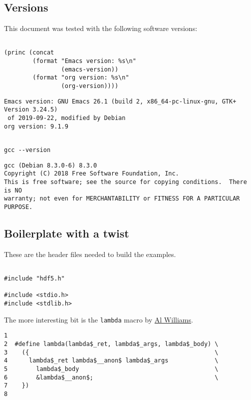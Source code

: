 \documentclass[a4paper, 12pt]{article}
\begin{document}
\subsection{Versions}
\label{sec:org5a092bd}
This document was tested with the following software versions:

\begin{verbatim}

(princ (concat
        (format "Emacs version: %s\n"
                (emacs-version))
        (format "org version: %s\n"
                (org-version))))

\end{verbatim}

\begin{verbatim}
Emacs version: GNU Emacs 26.1 (build 2, x86_64-pc-linux-gnu, GTK+ Version 3.24.5)
 of 2019-09-22, modified by Debian
org version: 9.1.9
\end{verbatim}

\begin{verbatim}

gcc --version

\end{verbatim}

\begin{verbatim}
gcc (Debian 8.3.0-6) 8.3.0
Copyright (C) 2018 Free Software Foundation, Inc.
This is free software; see the source for copying conditions.  There is NO
warranty; not even for MERCHANTABILITY or FITNESS FOR A PARTICULAR PURPOSE.

\end{verbatim}

\subsection{Boilerplate with a twist}
\label{sec:orgd07fd63}
These are the header files needed to build the examples.

\begin{verbatim}

#include "hdf5.h"

#include <stdio.h>
#include <stdlib.h>

\end{verbatim}

The more interesting bit is the \texttt{lambda} macro by \href{https://hackaday.com/2019/09/11/lambdas-for-c-sort-of/}{Al Williams}.

\begin{verbatim}
1
2  #define lambda(lambda$_ret, lambda$_args, lambda$_body) \
3    ({                                                    \
4      lambda$_ret lambda$__anon$ lambda$_args             \
5        lambda$_body                                      \
6        &lambda$__anon$;                                  \
7    })
8
\end{verbatim}
\end{document}
